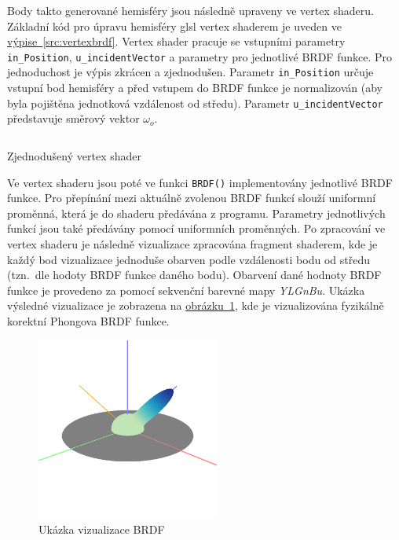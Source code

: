 \documentclass[czech,master]{diploma}
\newcommand{\outVec}{\omega_{o}}
\begin{document}
Body takto generované hemisféry jsou následně upraveny ve vertex shaderu. Základní kód pro úpravu hemisféry glsl vertex shaderem je uveden ve \hyperref[src:vertexbrdf]{výpise~\ref{src:vertexbrdf}}. Vertex shader pracuje se vstupními parametry \texttt{in\_Position}, \texttt{u\_incidentVector} a parametry pro jednotlivé BRDF funkce. Pro jednoduchost je výpis zkrácen a zjednodušen. Parametr \texttt{in\_Position} určuje vstupní bod hemisféry a před vstupem do BRDF funkce je normalizován (aby byla pojištěna jednotková vzdálenost od středu). Parametr \texttt{u\_incidentVector} představuje směrový vektor \(\outVec\). \par

\begin{listing}[ht]
  \inputminted{c++}{sampleshader.glsl}
  \caption{Zjednodušený vertex shader}
  \label{src:vertexbrdf}
\end{listing}

Ve vertex shaderu jsou poté ve funkci \texttt{BRDF()} implementovány jednotlivé BRDF funkce. Pro přepínání mezi aktuálně zvolenou BRDF funkcí slouží uniformní proměnná, která je do shaderu předávána z programu. Parametry jednotlivých funkcí jsou také předávány pomocí uniformních proměnných. Po zpracování ve vertex shaderu je následně vizualizace zpracována fragment shaderem, kde je každý bod vizualizace jednoduše obarven podle vzdálenosti bodu od středu (tzn.\ dle hodoty BRDF funkce daného bodu). Obarvení dané hodnoty BRDF funkce je provedeno za pomocí sekvenční barevné mapy \textit{YLGnBu}. Ukázka výsledné vizualizace je zobrazena na \hyperref[fig:brdfExample]{obrázku~\ref{fig:brdfExample}}, kde je vizualizována fyzikálně korektní Phongova BRDF funkce.

\begin{figure}
  \centering
  \includegraphics[width=6cm]{Figures/brdfVizExample.png}
  \caption{Ukázka vizualizace BRDF}%
  \label{fig:brdfExample}%
\end{figure}
\end{document}
